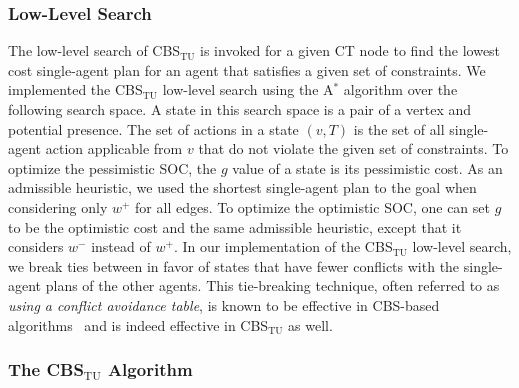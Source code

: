 \documentclass[jair,twoside,11pt,theapa]{article}
\newcommand{\timel}{w^-}
\newcommand{\astar}{A$^*$\xspace}
\newcommand{\timeu}{w^+}
\newcommand{\cbstu}{CBS$\mathrm{_{TU}}$\xspace}
\begin{document}
\subsubsection{Low-Level Search}
The low-level search of \cbstu is invoked for a given CT node to find the lowest cost single-agent plan for an agent that satisfies a given set of constraints. 
We implemented the \cbstu low-level search using the \astar algorithm over the following search space. 
A state in this search space is a pair of a vertex and potential presence. 
The set of actions in a state $(v,T)$ is the set of all single-agent action applicable from $v$ that do not violate the given set of constraints. 
To optimize the pessimistic SOC, the $g$ value of a state is its pessimistic cost.   
As an admissible heuristic, we used the shortest single-agent plan to the goal when considering only $\timeu$ for all edges. 
To optimize the optimistic SOC, one can set $g$ to be the optimistic cost and the same admissible heuristic, except that it considers $\timel$ instead of $\timeu$. 
In our implementation of the \cbstu low-level search, we break ties between in favor of states that have fewer conflicts with the single-agent plans of the other agents. 
This tie-breaking technique, often referred to as \emph{using a conflict avoidance table}, is known to be effective in CBS-based algorithms~ and is indeed effective in \cbstu as well. 

\subsubsection{The \cbstu Algorithm}
\end{document}
